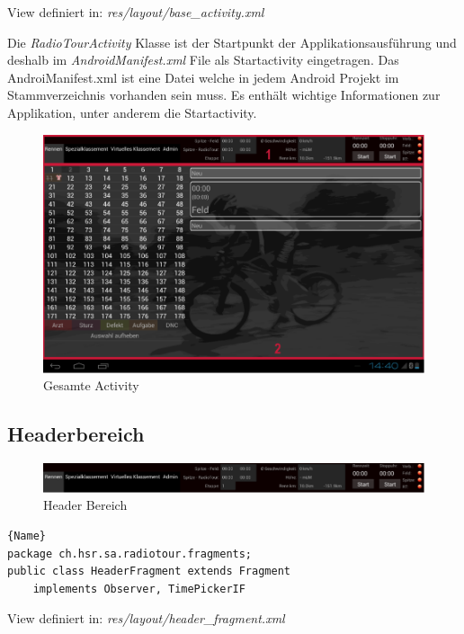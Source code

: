 View definiert in:
\textit{res/layout/base\_activity.xml}

Die \textit{RadioTourActivity} Klasse ist der Startpunkt der Applikationsausführung und deshalb im \textit{AndroidManifest.xml} File als Startactivity eingetragen. Das AndroiManifest.xml ist eine Datei welche in jedem Android Projekt im Stammverzeichnis vorhanden sein muss. Es enthält wichtige Informationen zur Applikation, unter anderem die Startactivity.


\begin{figure}[h!]
\caption{Gesamte Activity}
\label{fig:gesamteactivity}
\centering
\includegraphics[scale=0.8]{07anhang/images/dev_activity.png}
\end{figure}

\subsection{Headerbereich}

\begin{figure}[h!]
\caption{Header Bereich}
\label{fig:headerbereich}
\centering
\includegraphics[scale=0.8]{07anhang/images/dev_header.png}
\end{figure}


\begin{lstlisting}{Name}
package ch.hsr.sa.radiotour.fragments;
public class HeaderFragment extends Fragment
	implements Observer, TimePickerIF
\end{lstlisting}

View definiert in:
\textit{res/layout/header\_fragment.xml}

